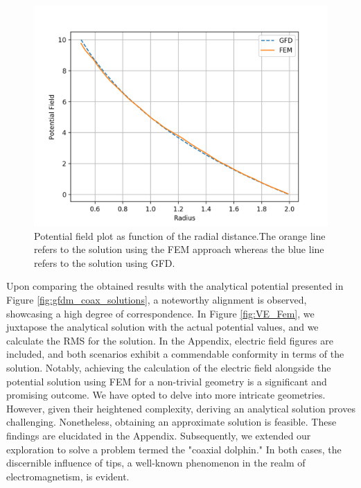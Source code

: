 \documentclass{PoS}
\begin{document}
\begin{figure}
    \centering
    \includegraphics[width=0.9\linewidth]{Figures/FEM/ComparissonPotentialFEMGFD.png}
    \caption{Potential field plot as function of the radial distance.The orange line refers to the solution using the FEM approach whereas the blue line refers to the solution using GFD.}
    \label{fig:GFDvFEM}
\end{figure}

Upon comparing the obtained results with the analytical potential presented in Figure \ref{fig:gfdm_coax_solutions}, a noteworthy alignment is observed, showcasing a high degree of correspondence. In Figure \ref{fig:VE_Fem}, we juxtapose the analytical solution with the actual potential values, and we calculate the RMS for the solution. In the Appendix, electric field figures are included, and both scenarios exhibit a commendable conformity in terms of the solution. Notably, achieving the calculation of the electric field alongside the potential solution using FEM for a non-trivial geometry is a significant and promising outcome. We have opted to delve into more intricate geometries. However, given their heightened complexity, deriving an analytical solution proves challenging. Nonetheless, obtaining an approximate solution is feasible. These findings are elucidated in the Appendix. Subsequently, we extended our exploration to solve a problem termed the "coaxial dolphin." In both cases, the discernible influence of tips, a well-known phenomenon in the realm of electromagnetism, is evident.

\end{document}
